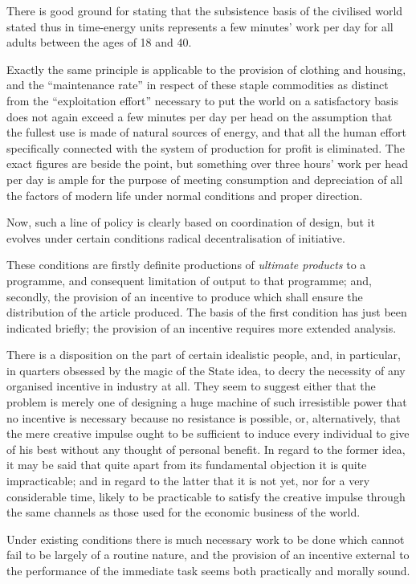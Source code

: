 \documentclass{book}
\begin{document}
There is good ground for stating that the subsistence basis of the civilised world stated thus in time-energy units represents a few minutes’ work per day for all adults between the ages of 18 and 40.

Exactly the same principle is applicable to the provision of clothing and housing, and the “maintenance rate” in respect of these staple commodities as distinct from the “exploitation effort” necessary to put the world on a satisfactory basis does not again exceed a few minutes per day per head on the assumption that the fullest use is made of natural sources of energy, and that all the human effort specifically connected with the system of production for profit is eliminated. The exact figures are beside the point, but something over three hours’ work per head per day is ample for the purpose of meeting consumption and depreciation of all the factors of modern life under normal conditions and proper direction.

Now, such a line of policy is clearly based on coordination of design, but it evolves under certain conditions radical decentralisation of initiative.

These conditions are firstly definite productions of \emph{ultimate products} to a programme, and consequent limitation of output to that programme; and, secondly, the provision of an incentive to produce which shall ensure the distribution of the article produced. The basis of the first condition has just been indicated briefly; the provision of an incentive requires more extended analysis.

There is a disposition on the part of certain idealistic people, and, in particular, in quarters obsessed by the magic of the State idea, to decry the necessity of any organised incentive in industry at all. They seem to suggest either that the problem is merely one of designing a huge machine of such irresistible power that no incentive is necessary because no resistance is possible, or, alternatively, that the mere creative impulse ought to be sufficient to induce every individual to give of his best without any thought of personal benefit. In regard to the former idea, it may be said that quite apart from its fundamental objection it is quite impracticable; and in regard to the latter that it is not yet, nor for a very considerable time, likely to be practicable to satisfy the creative impulse through the same channels as those used for the economic business of the world.

Under existing conditions there is much necessary work to be done which cannot fail to be largely of a routine nature, and the provision of an incentive external to the performance of the immediate task seems both practically and morally sound.
\end{document}
